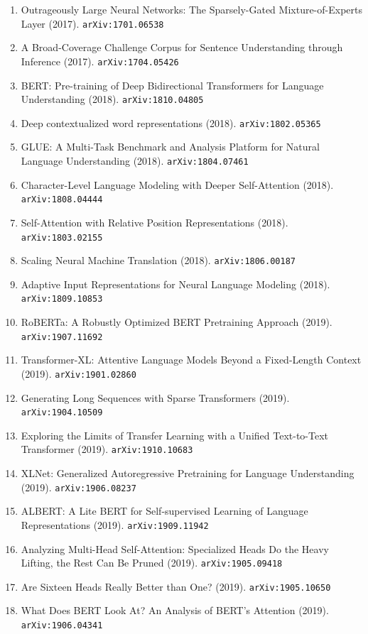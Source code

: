 \documentclass[11pt]{article}
\begin{document}
\begin{enumerate}
  \item Outrageously Large Neural Networks: The Sparsely-Gated
  Mixture-of-Experts Layer (2017). \texttt{arXiv:1701.06538}
  \item A Broad-Coverage Challenge Corpus for Sentence Understanding through
  Inference (2017). \texttt{arXiv:1704.05426}
  \item BERT: Pre-training of Deep Bidirectional Transformers for Language
  Understanding (2018). \texttt{arXiv:1810.04805}
  \item Deep contextualized word representations (2018). \texttt{arXiv:1802.05365}
  \item GLUE: A Multi-Task Benchmark and Analysis Platform for Natural Language
  Understanding (2018). \texttt{arXiv:1804.07461}
  \item Character-Level Language Modeling with Deeper Self-Attention (2018). \texttt{arXiv:1808.04444}
  \item Self-Attention with Relative Position Representations (2018). \texttt{arXiv:1803.02155}
  \item Scaling Neural Machine Translation (2018). \texttt{arXiv:1806.00187}
  \item Adaptive Input Representations for Neural Language Modeling (2018). \texttt{arXiv:1809.10853}
  \item RoBERTa: A Robustly Optimized BERT Pretraining Approach (2019). \texttt{arXiv:1907.11692}
  \item Transformer-XL: Attentive Language Models Beyond a Fixed-Length Context (2019). \texttt{arXiv:1901.02860}
  \item Generating Long Sequences with Sparse Transformers (2019). \texttt{arXiv:1904.10509}
  \item Exploring the Limits of Transfer Learning with a Unified Text-to-Text
  Transformer (2019). \texttt{arXiv:1910.10683}
  \item XLNet: Generalized Autoregressive Pretraining for Language Understanding (2019). \texttt{arXiv:1906.08237}
  \item ALBERT: A Lite BERT for Self-supervised Learning of Language
  Representations (2019). \texttt{arXiv:1909.11942}
  \item Analyzing Multi-Head Self-Attention: Specialized Heads Do the Heavy
  Lifting, the Rest Can Be Pruned (2019). \texttt{arXiv:1905.09418}
  \item Are Sixteen Heads Really Better than One? (2019). \texttt{arXiv:1905.10650}
  \item What Does BERT Look At? An Analysis of BERT's Attention (2019). \texttt{arXiv:1906.04341}

\end{enumerate}
\end{document}
